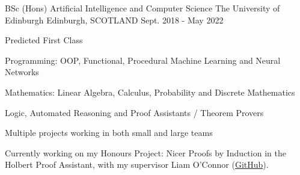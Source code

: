 

\begin{cventries}

  \cventry
    {BSc (Hons) Artificial Intelligence and Computer Science} %
    {The University of Edinburgh} %
    {Edinburgh, SCOTLAND} %
    {Sept. 2018 - May 2022} %
    {
        \begin{cvitems} %
            \item Predicted First Class
            \setlength\itemsep{0.5em}
            \item Programming: OOP, Functional, Procedural Machine Learning and Neural Networks
            \setlength\itemsep{0.1em}
            \item Mathematics: Linear Algebra, Calculus, Probability and Discrete Mathematics
            \item Logic, Automated Reasoning and Proof Assistants / Theorem  Provers
            \item Multiple projects working in both small and large teams
            \setlength\itemsep{0.5em}
            \item Currently working on my Honours Project: Nicer Proofs by Induction in the Holbert Proof Assistant, with my supervisor Liam O'Connor (\href{https://github.com/chrisjpm/holbert}{\textcolor{awesome}{GitHub}}).
        \end{cvitems}
    }

\end{cventries}
